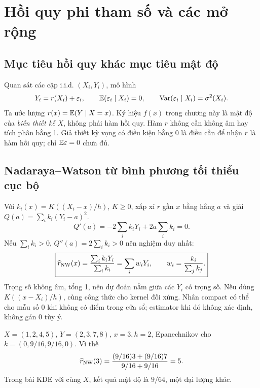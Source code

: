 \chapter{Hồi quy phi tham số và các mở rộng}\label{ch:regression}
\section{Mục tiêu hồi quy khác mục tiêu mật độ}
Quan sát các cặp i.i.d. $(X_i,Y_i)$, mô hình
\[
Y_i=r(X_i)+\varepsilon_i,\qquad
\mathbb E(\varepsilon_i\mid X_i)=0,\qquad
\operatorname{Var}(\varepsilon_i\mid X_i)=\sigma^2(X_i).
\]
Ta ước lượng $r(x)=\mathbb E(Y\mid X=x)$.
Ký hiệu $f(x)$ trong chương này là mật độ của \emph{biến thiết kế} $X$,
không phải hàm hồi quy. Hàm $r$ không cần không âm hay tích phân bằng 1.
Giả thiết kỳ vọng có điều kiện bằng 0 là điều cần để nhận $r$ là hàm
hồi quy; chỉ $\mathbb E\varepsilon=0$ chưa đủ.

\section{Nadaraya--Watson từ bình phương tối thiểu cục bộ}
Với $k_i(x)=K((X_i-x)/h)$, $K\geq0$, xấp xỉ $r$ gần $x$ bằng hằng
$a$ và giải $Q(a)=\sum_i k_i(Y_i-a)^2$.
\[
Q'(a)=-2\sum_i k_iY_i+2a\sum_i k_i=0.
\]
Nếu $\sum_i k_i>0$, $Q''(a)=2\sum_i k_i>0$ nên nghiệm duy nhất:
\[
\boxed{\widehat r_{\rm NW}(x)=\frac{\sum_i k_iY_i}{\sum_i k_i}
=\sum_i w_iY_i,\qquad w_i=\frac{k_i}{\sum_jk_j}.}
\]
Trọng số không âm, tổng 1, nên dự đoán nằm giữa các $Y_i$ có trọng số.
Nếu dùng $K((x-X_i)/h)$, cùng công thức cho kernel đối xứng.
Nhân compact có thể cho mẫu số 0 khi không có điểm trong cửa sổ;
estimator khi đó không xác định, không gán 0 tùy ý.

\begin{example}
$X=(1,2,4,5)$, $Y=(2,3,7,8)$, $x=3,h=2$, Epanechnikov cho
$k=(0,9/16,9/16,0)$. Vì thế
\[
\widehat r_{\rm NW}(3)=\frac{(9/16)3+(9/16)7}{9/16+9/16}=5.
\]
Trong bài KDE với cùng $X$, kết quả mật độ là $9/64$, một đại lượng khác.
\end{example}

